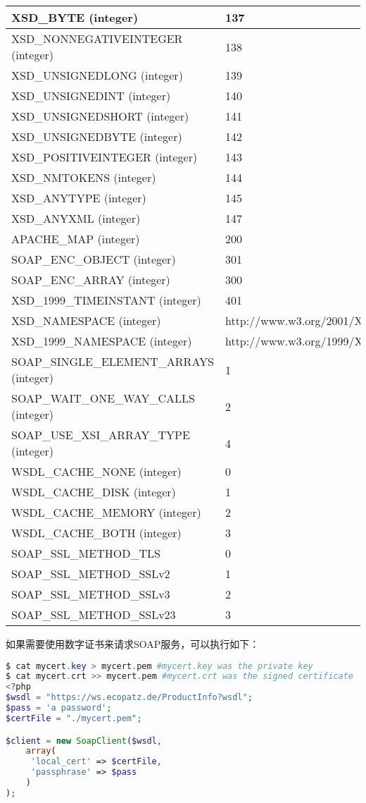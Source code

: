 \begin{longtable}{|m{150pt}|m{100pt}|}
\hline
XSD\_BYTE (integer)	&137	 \\
\hline
XSD\_NONNEGATIVEINTEGER (integer)	&138	 \\
\hline
XSD\_UNSIGNEDLONG (integer)	&139	 \\
\hline
XSD\_UNSIGNEDINT (integer)	&140	 \\
\hline
XSD\_UNSIGNEDSHORT (integer)	&141	 \\
\hline
XSD\_UNSIGNEDBYTE (integer)	&142	 \\
\hline
XSD\_POSITIVEINTEGER (integer)	&143	 \\
\hline
XSD\_NMTOKENS (integer)	&144	 \\
\hline
XSD\_ANYTYPE (integer)	&145	 \\
\hline
XSD\_ANYXML (integer)	&147	 \\
\hline
APACHE\_MAP (integer)	&200	 \\
\hline
SOAP\_ENC\_OBJECT (integer)	&301	 \\
\hline
SOAP\_ENC\_ARRAY (integer)	&300	 \\
\hline
XSD\_1999\_TIMEINSTANT (integer)	&401	 \\
\hline
XSD\_NAMESPACE (integer)	&http://www.w3.org/2001/XMLSchema	 \\
\hline
XSD\_1999\_NAMESPACE (integer)	&http://www.w3.org/1999/XMLSchema	 \\
\hline
SOAP\_SINGLE\_ELEMENT\_ARRAYS (integer)	&1	 \\
\hline
SOAP\_WAIT\_ONE\_WAY\_CALLS (integer)	&2	 \\
\hline
SOAP\_USE\_XSI\_ARRAY\_TYPE (integer)	&4	 \\
\hline
WSDL\_CACHE\_NONE (integer)	&0	 \\
\hline
WSDL\_CACHE\_DISK (integer)	&1	 \\
\hline
WSDL\_CACHE\_MEMORY (integer)	&2	 \\
\hline
WSDL\_CACHE\_BOTH (integer)	&3\\
\hline
SOAP\_SSL\_METHOD\_TLS & 0 \\
\hline
SOAP\_SSL\_METHOD\_SSLv2 & 1\\
\hline
SOAP\_SSL\_METHOD\_SSLv3 & 2\\
\hline
SOAP\_SSL\_METHOD\_SSLv23 & 3\\
\hline
\end{longtable}

如果需要使用数字证书来请求SOAP服务，可以执行如下：

\begin{lstlisting}[language=PHP]
$ cat mycert.key > mycert.pem #mycert.key was the private key
$ cat mycert.crt >> mycert.pem #mycert.crt was the signed certificate
<?php
$wsdl = "https://ws.ecopatz.de/ProductInfo?wsdl";
$pass = 'a password';
$certFile = "./mycert.pem";

$client = new SoapClient($wsdl,
    array(
     'local_cert' => $certFile,
     'passphrase' => $pass
    )
);
\end{lstlisting}


